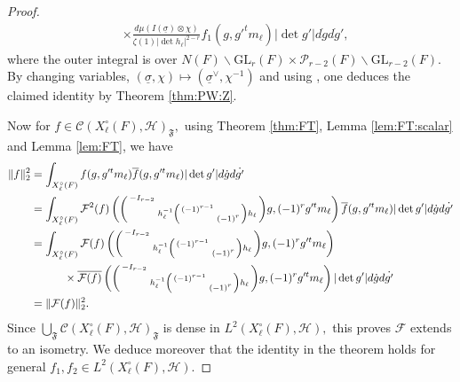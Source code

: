 \documentclass[12pt]{amsart}
\theoremstyle{remark}
\numberwithin{equation}{section}
\newcommand{\GL}{\mathrm{GL}}
\theoremstyle{definition}
\newenvironment{psmatrix}
  {\left(\begin{smallmatrix}}
  {\end{smallmatrix}\right)}
\numberwithin{equation}{subsection}
\newcommand{\norm}[1]{\lVert#1\rVert}
\begin{document}
\begin{proof}
\begin{align*}
     &\times \frac{d\mu(I(\underline{\sigma})\otimes\chi)}{\zeta(1)|\det h_\ell|^{2-r}}f_1(g,g'^tm_{\ell})|\det g'|d\dot{g}d\dot{g}',
\end{align*}
where the outer integral is over $N(F)\backslash\GL_r(F)\times \mathcal{P}_{r-2}(F)\backslash \GL_{r-2}(F)$. By changing variables, $(\underline{\sigma},\chi)\mapsto (\underline{\sigma}^\lor,\chi^{-1})$ and using , one deduces the claimed identity  by Theorem \ref{thm:PW:Z}.

 Now for $f\in \mathcal{C}(X^\circ_{\ell}(F),\mathcal{H})_{\mathfrak{F}},$ using Theorem \ref{thm:FT}, Lemma \ref{lem:FT:scalar} and Lemma \ref{lem:FT}, we have 
\begin{align*}
    \norm{f}_2^2&=\int_{X^\circ_{\ell}(F)} f(g,g'^tm_{\ell})\overline{f}(g,g'^tm_{\ell}) |\det g'|d\dot{g}d\dot{g'}\\
    &=\int_{X^\circ_{\ell}(F)} \mathcal{F}^2(f)\left(\begin{psmatrix} -I_{r-2}& \\ & h_\ell^{-1} \begin{psmatrix} (-1)^{r-1} &\\ & (-1)^{r}\end{psmatrix} h_\ell  \end{psmatrix}g,(-1)^{r}g'^tm_{\ell}\right)\overline{f}(g,g'^tm_{\ell}) |\det g'|d\dot{g}d\dot{g'}\\
    &=\int_{X^\circ_{\ell}(F)} \mathcal{F}(f)\left(\begin{psmatrix} -I_{r-2}& \\ & h_\ell^{-1} \begin{psmatrix} (-1)^{r-1} &\\ & (-1)^{r}\end{psmatrix} h_\ell  \end{psmatrix}g,(-1)^{r}g'^tm_{\ell}\right)\\
    &\quad\quad\quad\times\overline{\mathcal{F}(f)}\left(\begin{psmatrix} -I_{r-2}& \\ & h_\ell^{-1} \begin{psmatrix} (-1)^{r-1} &\\ & (-1)^{r}\end{psmatrix} h_\ell  \end{psmatrix}g,(-1)^{r} g'^tm_{\ell}\right) |\det g'|d\dot{g}d\dot{g'}\\
    &=\norm{\mathcal{F}(f)}_2^2.
\end{align*}
Since $\bigcup_{\mathfrak{F}}\mathcal{C}(X_\ell^\circ(F),\mathcal{H})_{\mathfrak{F}}$ is dense in $L^2(X_\ell^\circ(F),\mathcal{H}),$ this proves $\mathcal{F}$ extends to an isometry.  We deduce moreover that the identity in the theorem holds for general $f_1,f_2 \in L^2(X_\ell^\circ(F),\mathcal{H}).$
\end{proof}
\end{document}

